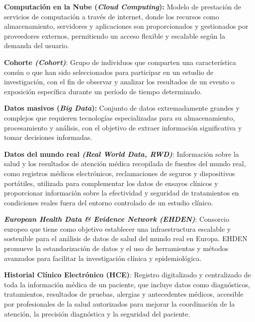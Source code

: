 \textbf{Computación en la Nube (\textit{Cloud Computing}):} Modelo de prestación de servicios de computación a través de internet, donde los recursos como almacenamiento, servidores y aplicaciones son proporcionados y gestionados por proveedores externos, permitiendo un acceso flexible y escalable según la demanda del usuario.

\textbf{Cohorte \textit{(Cohort)}}: Grupo de individuos que comparten una característica común o que han sido seleccionados para participar en un estudio de investigación, con el fin de observar y analizar los resultados de un evento o exposición específica durante un período de tiempo determinado.


\textbf{Datos masivos (\textit{Big Data}):} Conjunto de datos extremadamente grandes y complejos que requieren tecnologías especializadas para su almacenamiento, procesamiento y análisis, con el objetivo de extraer información significativa y tomar decisiones informadas.


\textbf{Datos del mundo real \textit{(Real World Data, RWD)}}: Información sobre la salud y los resultados de atención médica recopilada de fuentes del mundo real, como registros médicos electrónicos, reclamaciones de seguros y dispositivos portátiles, utilizada para complementar los datos de ensayos clínicos y proporcionar información sobre la efectividad y seguridad de tratamientos en condiciones reales fuera del entorno controlado de un estudio clínico.


\textbf{\textit{European Health Data \& Evidence Network (EHDEN)}}: Consorcio europeo que tiene como objetivo establecer una infraestructura escalable y sostenible para el análisis de datos de salud del mundo real en Europa. EHDEN promueve la estandarización de datos y el uso de herramientas y métodos avanzados para facilitar la investigación clínica y epidemiológica.





\textbf{Historial Clínico Electrónico (HCE)}: Registro digitalizado y centralizado de toda la información médica de un paciente, que incluye datos como diagnósticos, tratamientos, resultados de pruebas, alergias y antecedentes médicos, accesible por profesionales de la salud autorizados para mejorar la coordinación de la atención, la precisión diagnóstica y la seguridad del paciente.







